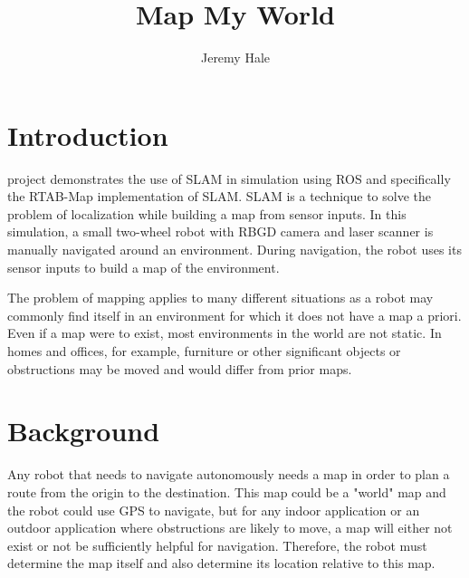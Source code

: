 \documentclass[10pt,journal,compsoc]{IEEEtran}
\begin{document}
\title{Map My World}

\author{Jeremy Hale}

%
{}


\maketitle
\IEEEdisplaynontitleabstractindextext
\IEEEpeerreviewmaketitle
\section{Introduction}
\label{sec:introduction}

 project demonstrates the use of SLAM in simulation using ROS and specifically the RTAB-Map implementation of SLAM. SLAM is a technique to solve the problem of localization while building a map from sensor inputs. In this simulation, a small two-wheel robot with RBGD camera and laser scanner is manually navigated around an environment. During navigation, the robot uses its sensor inputs to build a map of the environment.

The problem of mapping applies to many different situations as a robot may commonly find itself in an environment for which it does not have a map a priori. Even if a map were to exist, most environments in the world are not static. In homes and offices, for example, furniture or other significant objects or obstructions may be moved and would differ from prior maps.

\section{Background}
Any robot that needs to navigate autonomously needs a map in order to plan a route from the origin to the destination. This map could be a "world" map and the robot could use GPS to navigate, but for any indoor application or an outdoor application where obstructions are likely to move, a map will either not exist or not be sufficiently helpful for navigation. Therefore, the robot must determine the map itself and also determine its location relative to this map.
\end{document}
